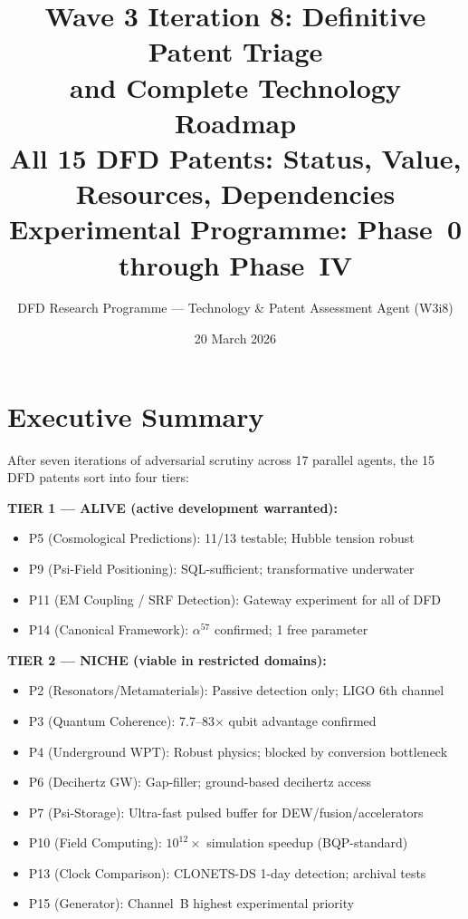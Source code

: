 \documentclass[11pt]{article}
\title{\textbf{Wave 3 Iteration 8: Definitive Patent Triage}\\[6pt]
\textbf{and Complete Technology Roadmap}\\[12pt]
{\large All 15 DFD Patents: Status, Value, Resources, Dependencies}\\[4pt]
{\large Experimental Programme: Phase~0 through Phase~IV}}
\author{DFD Research Programme --- Technology \& Patent Assessment Agent (W3i8)}
\date{20 March 2026}
\begin{document}
\maketitle
\tableofcontents
\newpage

\section*{Executive Summary}

\begin{tcolorbox}[colback=blue!5!white, colframe=blue!60!black,
  title=\textbf{W3i8 PATENT TRIAGE: READ THIS FIRST}]

After seven iterations of adversarial scrutiny across 17 parallel agents,
the 15 DFD patents sort into four tiers:

\medskip
\textbf{TIER 1 --- ALIVE (active development warranted):}
\begin{itemize}[nosep]
  \item P5 (Cosmological Predictions): 11/13 testable; Hubble tension robust
  \item P9 (Psi-Field Positioning): SQL-sufficient; transformative underwater
  \item P11 (EM Coupling / SRF Detection): Gateway experiment for all of DFD
  \item P14 (Canonical Framework): $\alpha^{57}$ confirmed; 1 free parameter
\end{itemize}

\textbf{TIER 2 --- NICHE (viable in restricted domains):}
\begin{itemize}[nosep]
  \item P2 (Resonators/Metamaterials): Passive detection only; LIGO 6th channel
  \item P3 (Quantum Coherence): 7.7--83$\times$ qubit advantage confirmed
  \item P4 (Underground WPT): Robust physics; blocked by conversion bottleneck
  \item P6 (Decihertz GW): Gap-filler; ground-based decihertz access
  \item P7 (Psi-Storage): Ultra-fast pulsed buffer for DEW/fusion/accelerators
  \item P10 (Field Computing): $10^{12}\times$ simulation speedup (BQP-standard)
  \item P13 (Clock Comparison): CLONETS-DS 1-day detection; archival tests
  \item P15 (Generator): Channel~B highest experimental priority
\end{itemize}


\end{tcolorbox}
\end{document}

